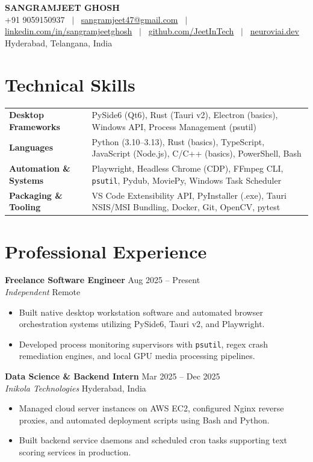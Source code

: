 \documentclass[10pt]{article}
\makeatletter
\newcommand{\resumeHeader}{
\begin{center}
{\LARGE \textbf{SANGRAMJEET GHOSH}} \\[3pt]
{\small
+91 9059150937 ~$|$~
\href{mailto:sangramjeet47@gmail.com}{sangramjeet47@gmail.com} ~$|$~
\href{https://www.linkedin.com/in/sangramjeetghosh}{linkedin.com/in/sangramjeetghosh} ~$|$~
\href{https://github.com/JeetInTech}{github.com/JeetInTech} ~$|$~
\href{https://neuroviai.dev}{neuroviai.dev}
}\\[1pt]
{\footnotesize Hyderabad, Telangana, India}
\end{center}
\vspace{-8pt}
}
\makeatother
\begin{document}
\resumeHeader

\section*{Technical Skills}
\begin{tabularx}{\textwidth}{@{}l X@{}}
\textbf{Desktop Frameworks} & PySide6 (Qt6), Rust (Tauri v2), Electron (basics), Windows API, Process Management (psutil) \\[1.5pt]
\textbf{Languages} & Python (3.10--3.13), Rust (basics), TypeScript, JavaScript (Node.js), C/C++ (basics), PowerShell, Bash \\[1.5pt]
\textbf{Automation \& Systems} & Playwright, Headless Chrome (CDP), FFmpeg CLI, \texttt{psutil}, Pydub, MoviePy, Windows Task Scheduler \\[1.5pt]
\textbf{Packaging \& Tooling} & VS Code Extensibility API, PyInstaller (.exe), Tauri NSIS/MSI Bundling, Docker, Git, OpenCV, pytest \\
\end{tabularx}

\section*{Professional Experience}
\textbf{Freelance Software Engineer} \hfill Aug 2025 -- Present \\
\textit{Independent} \hfill Remote
\begin{itemize}
    \item Built native desktop workstation software and automated browser orchestration systems utilizing PySide6, Tauri v2, and Playwright.
    \item Developed process monitoring supervisors with \texttt{psutil}, regex crash remediation engines, and local GPU media processing pipelines.
\end{itemize}

\vspace{1.5pt}
\textbf{Data Science \& Backend Intern} \hfill Mar 2025 -- Dec 2025 \\
\textit{Inikola Technologies} \hfill Hyderabad, India
\begin{itemize}
    \item Managed cloud server instances on AWS EC2, configured Nginx reverse proxies, and automated deployment scripts using Bash and Python.
    \item Built backend service daemons and scheduled cron tasks supporting text scoring services in production.
\end{itemize}
\end{document}
